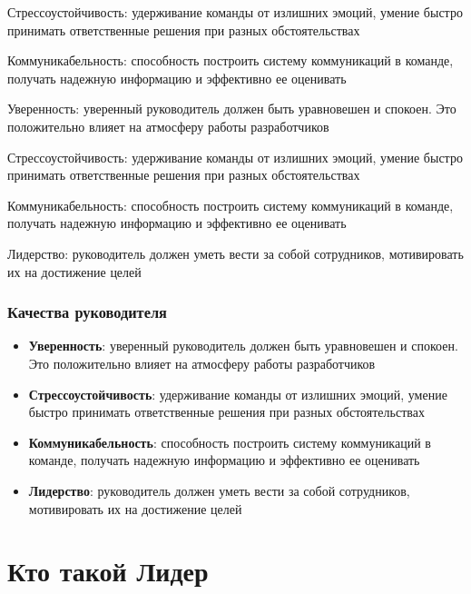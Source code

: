 \documentclass{../industrial-development}
\begin{document}
Стрессоустойчивость: удерживание команды от излишних эмоций, умение быстро принимать ответственные решения при разных обстоятельствах

Коммуникабельность: способность построить систему коммуникаций в команде, получать надежную информацию и эффективно ее оценивать

Уверенность: уверенный руководитель должен быть уравновешен и спокоен. Это положительно влияет на атмосферу работы разработчиков 

Стрессоустойчивость: удерживание команды от излишних эмоций, умение быстро принимать ответственные решения при разных обстоятельствах

Коммуникабельность: способность построить систему коммуникаций в команде, получать надежную информацию и эффективно ее оценивать

Лидерство: руководитель должен уметь вести за собой сотрудников, мотивировать их на достижение целей

   
\begin{frame} \frametitle{Качества руководителя}

  \begin{itemize}
  
  \item \textbf{Уверенность}: уверенный руководитель должен быть уравновешен и спокоен. Это положительно влияет на атмосферу работы разработчиков 
 \item \textbf{Стрессоустойчивость}: удерживание команды от излишних эмоций, умение быстро принимать ответственные решения при разных обстоятельствах
 \item \textbf{Коммуникабельность}: способность построить систему коммуникаций в команде, получать надежную информацию и эффективно ее оценивать
 \item \textbf{Лидерство}: руководитель должен уметь вести за собой сотрудников, мотивировать их на достижение целей
  \end{itemize}
\end{frame}

\lecturenotes

\section{Кто такой Лидер}
\end{document}
